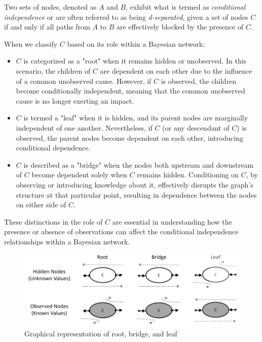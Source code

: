 \documentclass[12pt, a4paper]{report}
\begin{document}
    \begin{definition}
        Two sets of nodes, denoted as $A$ and $B$, exhibit what is termed as \emph{conditional independence} or are often referred to as being \emph{d-separated}, given a set of nodes $C$ if and only if all paths from $A$ to $B$ are effectively blocked by the presence of $C$.
    \end{definition}
    When we classify $C$ based on its role within a Bayesian network:
    \begin{itemize}
        \item $C$ is categorized as a "root" when it remains hidden or unobserved. 
            In this scenario, the children of $C$ are dependent on each other due to the influence of a common unobserved cause. 
            However, if $C$ is observed, the children become conditionally independent, meaning that the common unobserved cause is no longer exerting an impact.
        \item $C$ is termed a "leaf" when it is hidden, and its parent nodes are marginally independent of one another. 
            Nevertheless, if $C$ (or any descendant of $C$) is observed, the parent nodes become dependent on each other, introducing conditional dependence.
        \item $C$ is described as a "bridge" when the nodes both upstream and downstream of $C$ become dependent solely when $C$ remains hidden. 
            Conditioning on $C$, by observing or introducing knowledge about it, effectively disrupts the graph's structure at that particular point, resulting in dependence between the nodes on either side of $C$.
    \end{itemize}
    These distinctions in the role of $C$ are essential in understanding how the presence or absence of observations can affect the conditional independence relationships within a Bayesian network.
    \begin{figure}[H]
        \centering
        \includegraphics[width=0.75\linewidth]{images/def.png}
        \caption{Graphical representation of root, bridge, and leaf}
    \end{figure}
\end{document}
